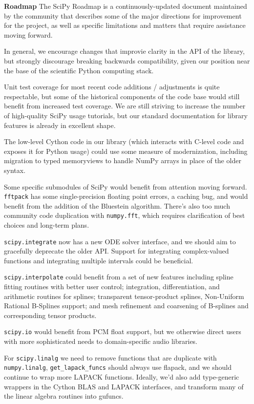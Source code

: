 \documentclass[fleqn,10pt]{wlscirep}
\begin{document}
\textbf{Roadmap}
The SciPy Roadmap\cite{SciPy_roadmap} is a continuously-updated document
maintained by the community that describes some of the major directions
for improvement for the project, as well as specific limitations and
matters that require assistance moving forward.

In general, we encourage changes that improvie clarity in the API of the library,
but strongly discourage breaking backwards compatibility, given our position near
the base of the scientific Python computing stack.

Unit test coverage for most recent code additions / adjustments is quite
respectable, but some of the historical components of the code base
would still benefit from increased test coverage. We are still striving
to increase the number of high-quality SciPy usage tutorials, but our
standard documentation for library features is already in excellent shape.

The low-level Cython code in our library (which interacts with C-level
code and exposes it for Python usage) could use some measure of modernization,
including migration to typed memoryviews to handle NumPy arrays in place
of the older syntax.

Some specific submodules of SciPy would benefit from  attention moving forward.
\texttt{fftpack} has some single-precision floating point errors, a caching bug,
and would benefit from the addition of the Bluestein algorithm. There's also
too much community code duplication with \texttt{numpy.fft}, which
requires clarification of best choices and long-term plans.

\texttt{scipy.integrate} now has a new ODE solver interface, and we should aim
to gracefully deprecate the older API. Support for integrating complex-valued
functions and integrating multiple intervals could be beneficial.

\texttt{scipy.interpolate} could benefit from a set of new features including
spline fitting routines with better user control; integration, differentiation,
and arithmetic routines for splines; transparent tensor-product splines,
Non-Uniform Rational B-Splines support; and mesh refinement and coarsening of
B-splines and corresponding tensor products.

\texttt{scipy.io} would benefit from PCM float support, but we otherwise
direct users with more sophisticated needs to domain-specific audio
libraries.

For \texttt{scipy.linalg} we need to remove functions that are duplicate with 
\texttt{numpy.linalg}, \texttt{get\_lapack\_funcs} should always use flapack, and
we should continue to wrap more LAPACK functions. Ideally, we'd also
add type-generic wrappers in the Cython BLAS and LAPACK interfaces, and
transform many of the linear algebra routines into gufuncs.
\end{document}
